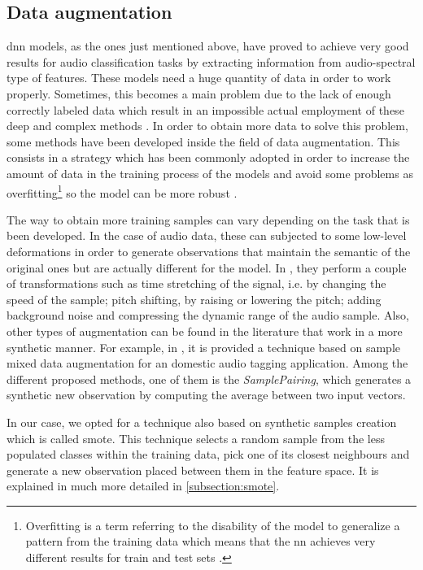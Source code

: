 	


\subsection{Data augmentation}
\label{subsection:data-augmentation}

	\acrlong{dnn} models, as the ones just mentioned above, have proved to achieve very good results for audio classification tasks by extracting information from audio-spectral type of features. These models need a huge quantity of data in order to work properly. Sometimes, this becomes a main problem due to the lack of enough correctly labeled data which result in an impossible actual employment of these deep and complex methods \cite{Salamon2017}. In order to obtain more data to solve this problem, some methods have been developed inside the field of data augmentation. This consists in a strategy which has been commonly adopted in order to increase the amount of data in the training process of the models and avoid some problems as overfitting\footnote{Overfitting is a term referring to the disability of the model to generalize a pattern from the training data which means that the \acrshort{nn} achieves very different results for train and test sets \cite{Jabbar2015}.} so the model can be more robust \cite{Ko2015}.
	
	The way to obtain more training samples can vary depending on the task that is been developed. In the case of audio data, these can subjected to some low-level deformations in order to generate observations that maintain the semantic of the original ones but are actually different for the model. In \cite{Salamon2017a}, they perform a couple of transformations such as time stretching of the signal, i.e. by changing the speed of the sample; pitch shifting, by raising or lowering the pitch; adding background noise and compressing the dynamic range of the audio sample. Also, other types of augmentation can be found in the literature that work in a more synthetic manner. For example, in \cite{Wei2018}, it is provided a technique based on sample mixed data augmentation for an domestic audio tagging application. Among the different proposed methods, one of them is the \textit{SamplePairing}, which generates a synthetic new observation by computing the average between two input vectors.
	
	In our case, we opted for a technique also based on synthetic samples creation which is called \acrfull{smote}. This technique selects a random sample from the less populated classes within the training data, pick one of its closest neighbours and generate a new observation placed between them in the feature space. It is explained in much more detailed in \ref{subsection:smote}.
	

